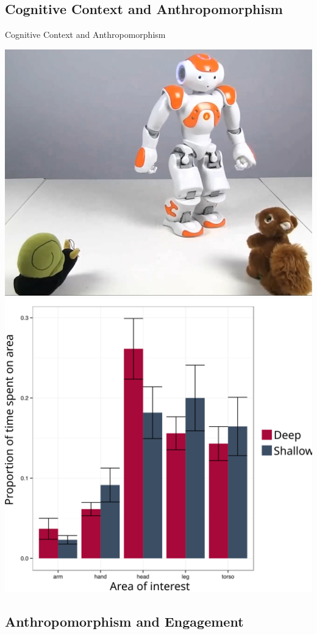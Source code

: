 \documentclass[compress]{beamer}
\begin{document}
\subsection{Cognitive Context and Anthropomorphism}

{
\begin{frame}{Cognitive Context and Anthropomorphism}
    \begin{center}
        \includegraphics[width=0.45\linewidth]{stimulus-toys}
        \hspace*{1cm}
        \includegraphics[width=0.45\linewidth]{cognitive-priming}
    \end{center}
\end{frame}
}

\subsection{Anthropomorphism and Engagement}
\end{document}
